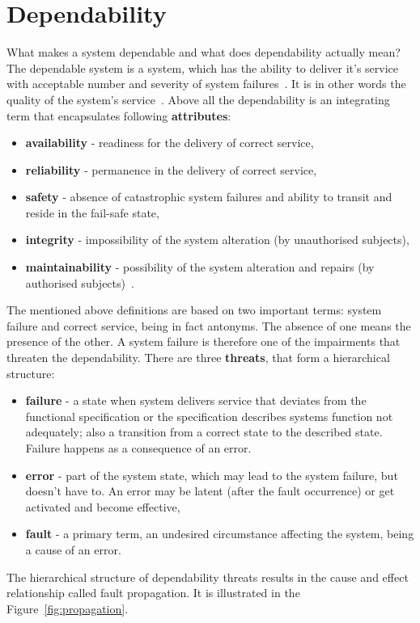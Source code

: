 \documentclass[]{myclass}
\begin{document}
\chapter{Dependability} \label{ch:dep}
What makes a system dependable and what does dependability actually mean? \\
The dependable system is a system, which has the ability to deliver it's service with acceptable number and severity of system failures~\cite{art:Avizienis}. It is in other words the quality of the system's service~\cite{art:Laprie}. Above all the dependability is an integrating term that encapsulates following \textbf{attributes}:
\begin{itemize}
\item \textbf{availability} - readiness for the delivery of correct service,
\item \textbf{reliability} - permanence in the delivery of correct service,
\item \textbf{safety} - absence of catastrophic system failures and ability to transit and reside in the fail-safe state,
\item \textbf{integrity} - impossibility of the system alteration (by unauthorised subjects),
\item \textbf{maintainability} - possibility of the system alteration and repairs (by authorised subjects)~\cite{art:Laprie}\cite{art:Avizienis}.
\end{itemize}
The mentioned above definitions are based on two important terms: system failure and correct service, being in fact antonyms. The absence of one means the presence of the other. A system failure is therefore one of the impairments that threaten the  dependability. There are three \textbf{threats}, that form a hierarchical structure:
\begin{itemize}
    \item \textbf{failure} - a state when system delivers service that deviates from the functional specification or the specification describes systems function not adequately; also a transition from a correct state to the described state. Failure happens as a consequence of an error.
    \item \textbf{error} - part of the system state, which may lead to the system failure, but doesn't have to. An error may be latent (after the fault occurrence) or get activated and become effective,
    \item \textbf{fault} - a primary term, an undesired circumstance affecting the system, being a cause of an error.
\end{itemize}
The hierarchical structure of dependability threats results in the cause and effect relationship called fault propagation. It is illustrated in the {Figure~\ref*{fig:propagation}}. 
\end{document}
